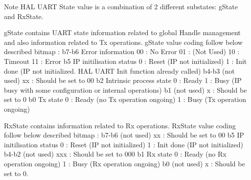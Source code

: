 \begin{DoxyNote}{Note}
H\+AL U\+A\+RT State value is a combination of 2 different substates\+: g\+State and Rx\+State.
\begin{DoxyItemize}
\item g\+State contains U\+A\+RT state information related to global Handle management and also information related to Tx operations. g\+State value coding follow below described bitmap \+: b7-\/b6 Error information 00 \+: No Error 01 \+: (Not Used) 10 \+: Timeout 11 \+: Error b5 IP initilisation status 0 \+: Reset (IP not initialized) 1 \+: Init done (IP not initialized. H\+AL U\+A\+RT Init function already called) b4-\/b3 (not used) xx \+: Should be set to 00 b2 Intrinsic process state 0 \+: Ready 1 \+: Busy (IP busy with some configuration or internal operations) b1 (not used) x \+: Should be set to 0 b0 Tx state 0 \+: Ready (no Tx operation ongoing) 1 \+: Busy (Tx operation ongoing)
\item Rx\+State contains information related to Rx operations. Rx\+State value coding follow below described bitmap \+: b7-\/b6 (not used) xx \+: Should be set to 00 b5 IP initilisation status 0 \+: Reset (IP not initialized) 1 \+: Init done (IP not initialized) b4-\/b2 (not used) xxx \+: Should be set to 000 b1 Rx state 0 \+: Ready (no Rx operation ongoing) 1 \+: Busy (Rx operation ongoing) b0 (not used) x \+: Should be set to 0. 
\end{DoxyItemize}
\end{DoxyNote}
